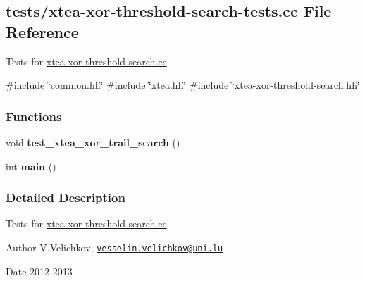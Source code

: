 \hypertarget{xtea-xor-threshold-search-tests_8cc}{\subsection{tests/xtea-\/xor-\/threshold-\/search-\/tests.cc \-File \-Reference}
\label{xtea-xor-threshold-search-tests_8cc}
}


\-Tests for \hyperlink{xtea-xor-threshold-search_8cc}{xtea-\/xor-\/threshold-\/search.\-cc}.  


{\ttfamily \#include \char`\"{}common.\-hh\char`\"{}}\*
{\ttfamily \#include \char`\"{}xtea.\-hh\char`\"{}}\*
{\ttfamily \#include \char`\"{}xtea-\/xor-\/threshold-\/search.\-hh\char`\"{}}\*
\subsubsection*{\-Functions}
\begin{DoxyCompactItemize}
\item 
\hypertarget{xtea-xor-threshold-search-tests_8cc_a2c798f9878a0f302269fa2e402741162}{void {\bfseries test\-\_\-xtea\-\_\-xor\-\_\-trail\-\_\-search} ()}\label{xtea-xor-threshold-search-tests_8cc_a2c798f9878a0f302269fa2e402741162}

\item 
\hypertarget{xtea-xor-threshold-search-tests_8cc_ae66f6b31b5ad750f1fe042a706a4e3d4}{int {\bfseries main} ()}\label{xtea-xor-threshold-search-tests_8cc_ae66f6b31b5ad750f1fe042a706a4e3d4}

\end{DoxyCompactItemize}


\subsubsection{\-Detailed \-Description}
\-Tests for \hyperlink{xtea-xor-threshold-search_8cc}{xtea-\/xor-\/threshold-\/search.\-cc}. \begin{DoxyAuthor}{\-Author}
\-V.\-Velichkov, \href{mailto:vesselin.velichkov@uni.lu}{\tt vesselin.\-velichkov@uni.\-lu} 
\end{DoxyAuthor}
\begin{DoxyDate}{\-Date}
2012-\/2013 
\end{DoxyDate}
